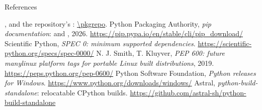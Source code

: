 \documentclass[aspectratio=169,11pt]{beamer}
\begin{document}
\begin{frame}{References}
\begin{reflist}
   , and the repository's
        : \url{\pkgrepo}.
   Python Packaging Authority, \emph{pip documentation}:  and , 2026.
        \url{https://pip.pypa.io/en/stable/cli/pip_download/}
   Scientific Python, \emph{SPEC 0: minimum supported dependencies}.
        \url{https://scientific-python.org/specs/spec-0000/}
   N. J. Smith, T. Kluyver, \emph{PEP 600: future manylinux platform
        tags for portable Linux built distributions}, 2019.
        \url{https://peps.python.org/pep-0600/}
   Python Software Foundation, \emph{Python releases for Windows}.
        \url{https://www.python.org/downloads/windows/}
   Astral, \emph{python-build-standalone}: relocatable CPython builds.
        \url{https://github.com/astral-sh/python-build-standalone}
\end{reflist}
\end{frame}
\end{document}
